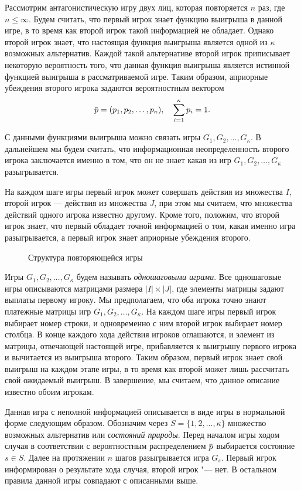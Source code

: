 {Рассмотрим антагонистическую игру двух лиц, которая повторяется $n$ раз, где $n\leq \infty$.
Будем считать, что первый игрок знает функцию выигрыша в данной игре, в то время как второй игрок такой информацией не обладает.
Однако второй игрок знает, что настоящая функция выигрыша является одной из $\kappa$ возможных альтернатив.
Каждой такой альтернативе второй игрок приписывает некоторую вероятность того, что данная функция выигрыша является истинной функцией выигрыша в рассматриваемой
игре.
Таким образом, априорные убеждения второго игрока задаются вероятностным вектором
\[
  \p = (p_1, p_2, \ldots, p_\kappa),\quad \sum_{i=1}^\kappa p_i = 1.
\]

С данными функциями выигрыша можно связать игры $G_1, G_2, \ldots, G_\kappa$.
В дальнейшем мы будем считать, что информационная неопределенность второго игрока заключается именно в том, что он не знает какая из игр $G_1, G_2, \ldots, G_\kappa$ разыгрывается.

На каждом шаге игры первый игрок может совершать действия из множества $I$, второй игрок --- действия из множества $J$, при этом мы считаем, что множества действий одного игрока известно другому.
Кроме того, положим, что второй игрок знает, что первый обладает точной информацией о том, какая именно игра разыгрывается, а первый игрок знает априорные убеждения второго.

\begin{figure}[t]
  \centering
  
  \caption{Структура повторяющейся игры}
  \label{ch1:fig:game_structure}
\end{figure}

Игры $G_1, G_2, \ldots, G_\kappa$ будем называть \emph{одношаговыми играми}.
Все одношаговые игры описываются матрицами размера $|I| \times |J|$, где элементы матрицы задают выплаты первому игроку.
Мы предполагаем, что оба игрока точно знают платежные матрицы игр $G_1, G_2, \ldots, G_\kappa$.
На каждом шаге игры первый игрок выбирает номер строки, и одновременно с ним второй игрок выбирает номер столбца.
В конце каждого хода действия игроков оглашаются, и элемент из матрицы, отвечающей настоящей игре, прибавляется к выигрышу первого игрока и вычитается из выигрыша второго.
Таким образом, первый игрок знает свой выигрыш на каждом этапе игры, в то время как второй может лишь рассчитать свой ожидаемый выигрыш.
В завершение, мы считаем, что данное описание известно обоим игрокам.

Данная игра с неполной информацией описывается в виде игры в нормальной форме следующим образом.
Обозначим через $S = \{1, 2, \ldots, \kappa\}$ множество возможных альтернатив или \emph{состояний природы}.
Перед началом игры ходом случая в соответствии с вероятностным распределением $\p$ выбирается состояние $s \in S$.
Далее на протяжении $n$ шагов разыгрывается игра $G_s$.
Первый игрок информирован о результате хода случая, второй игрок "--- нет.
В остальном правила данной игры совпадают с описанными выше.

}
